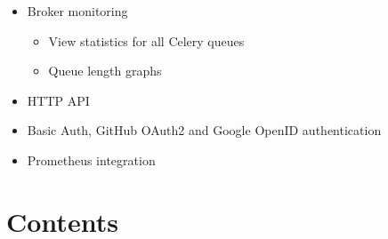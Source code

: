 \documentclass[letterpaper,10pt,english]{sphinxmanual}
\begin{document}
\begin{itemize}
\begin{itemize}
\end{itemize}

\item {} 
Broker monitoring
\begin{itemize}
\item {} 
View statistics for all Celery queues

\item {} 
Queue length graphs

\end{itemize}

\item {} 
HTTP API

\item {} 
Basic Auth, GitHub OAuth2 and Google OpenID authentication

\item {} 
Prometheus integration

\end{itemize}


\section{Contents}
\label{\detokenize{index:contents}}
\end{document}
